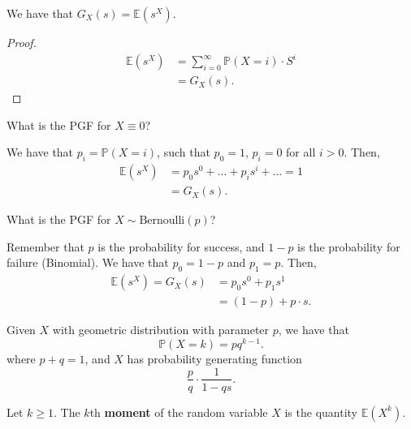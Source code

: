 
\begin{theorem}
	We have that \( G_X(s) = \mathbb{E}(s^{X} ) \).
\end{theorem}
\begin{proof}
	\begin{align*}
		\mathbb{E}(s^{X} ) &= \sum_{i=0}^{\infty} \mathbb{P}(X=i) \cdot {S^i}  \\
		&=  G_X(s) 
	.\end{align*}
\end{proof}

\begin{eg}
	What is the PGF for \( X\equiv 0 \)?
\end{eg}
\begin{explanation}
	We have that \( p_i = \mathbb{P}(X=i) \), such that \( p_{0} =1\), \( p_i = 0 \) for all \( i>0 \). Then, 
	\begin{align*}
		\mathbb{E}(s^{X} ) &= p_{0}s^{0} + \ldots  + p_i s^{i} + \ldots  = 1 \\
		&= G_X(s) 
	.\end{align*}
\end{explanation}

\begin{eg}
	What is the PGF for \( X \sim \text{Bernoulli}(p) \)?
\end{eg}
\begin{explanation}
	Remember that \( p \) is the probability for success, and \( 1-p \) is the probability for failure (Binomial). We have that \( p_{0} = 1-p \) and \( p_{1}=p \). Then, 
	\begin{align*}
		\mathbb{E}(s^{X} ) = G_X(s) &= p_{0}s^{0}+ p_{1}s^{1}   \\
		&= (1 - p) + p \cdot  s 
	.\end{align*}
\end{explanation}

\begin{theorem}
	Given \( X \) with geometric distribution with parameter \( p \), we have that \[
		\mathbb{P}(X = k) = pq^{k-1} 
	.\] where \( p + q = 1 \), and \( X  \) has probability generating function \[
		\frac{p}{q}\cdot \frac{1}{1-qs}
	.\] 
\end{theorem}

\begin{definition}
	Let \( k\ge 1 \). The \( k \)th \textbf{moment} of the random variable \( X \) is the quantity \( \mathbb{E}(X^{k} ) \).
\end{definition}

